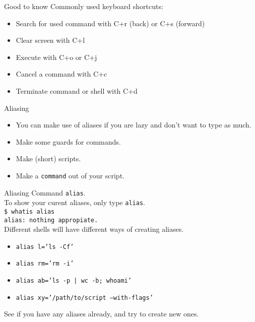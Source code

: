 \documentclass{beamer}
\let\tt\texttt
\begin{document}
\begin{frame}{Good to know}
        Commonly used keyboard shortcuts: \\
        \begin{itemize}
                \item Search for used command with C+r (back) or C+s (forward)
                \item Clear screen with C+l
                \item Execute with C+o or C+j
                \item Cancel a command with C+c
                \item Terminate command or shell with C+d
        \end{itemize}
\end{frame}

\begin{frame}{Aliasing}
        \begin{itemize}
                \item You can make use of aliases if you are lazy and don't want to type as much. \\
                \item Make some guards for commands.    \\
                \item Make (short) scripts.             \\
                \item Make a \tt{command} out of your script.
        \end{itemize}
\end{frame}

\begin{frame}{Aliasing}
        Command \tt{alias}. \\
        To show your curent aliases, only type \tt{alias}. \\
        \tt{\$ whatis alias} \\
        \tt{alias: nothing appropiate.} \\
        Different shells will have different ways of creating aliases. \\
        \begin{itemize}
                \item \tt{alias l='ls -Cf'}
                \item \tt{alias rm='rm -i'}
                \item \tt{alias ab='ls -p | wc -b; whoami'}
                \item \tt{alias xy='/path/to/script --with-flags'}
        \end{itemize}
        See if you have any aliases already, and try to create new ones.
\end{frame}
\end{document}
